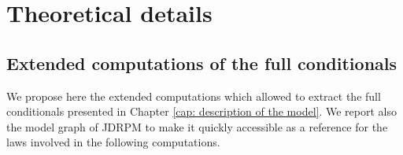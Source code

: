 \documentclass[12pt,	%
	a4paper,		%
	twoside,		%
	openright,		%
	titlepage,%
	]{book}
\theoremstyle{definition}
\newcommand{\mjline}[1]{\texttt{#1}}
\begin{document}



\appendix
% 
% 

\chapter{Theoretical details}
\label{app: theoretical details}

\section{Extended computations of the full conditionals} 
We propose here the extended computations which allowed to extract the full conditionals presented in Chapter \ref{cap: description of the model}. We report also the model graph of JDRPM to make it quickly accessible as a reference for the laws involved in the following computations.
\end{document}

